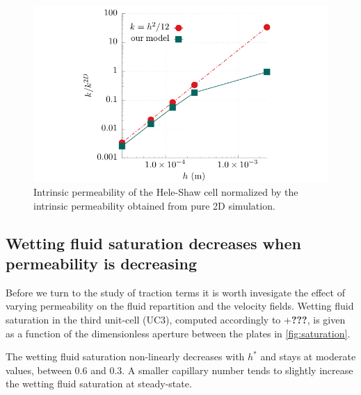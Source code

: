 \documentclass[]{article}
\begin{document}
\begin{figure}
\hypertarget{fig:permeability}{%
\centering
\includegraphics{figures/pdf/permeability.pdf}
\caption{Intrinsic permeability of the Hele-Shaw cell normalized by the
intrinsic permeability obtained from pure 2D
simulation.}\label{fig:permeability}
}
\end{figure}

\hypertarget{wetting-fluid-saturation-decreases-when-permeability-is-decreasing}{%
\subsection{Wetting fluid saturation decreases when permeability is
decreasing}\label{wetting-fluid-saturation-decreases-when-permeability-is-decreasing}}

Before we turn to the study of traction terms it is worth invesigate the
effect of varying permeability on the fluid repartition and the velocity
fields. Wetting fluid saturation in the third unit-cell (UC3), computed
accordingly to +\textbf{???}, is given as a function of the
dimensionless aperture between the plates in \cref{fig:saturation}.

The wetting fluid saturation non-linearly decreases with \(h^*\) and
stays at moderate values, between 0.6 and 0.3. A smaller capillary
number tends to slightly increase the wetting fluid saturation at
steady-state.
\end{document}
